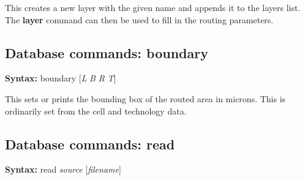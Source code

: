 This creates a new layer with the given name and appends it to the
layers list.  The {\bf layer} command can then be used to fill in the
routing parameters.

\subsection{Database commands: {\vt boundary}}

{\bf Syntax:} {\vt boundary} [{\it L} {\it B} {\it R} {\it T\/}]

This sets or prints the bounding box of the routed area in microns. 
This is ordinarily set from the cell and technology data.

\subsection{Database commands: {\vt read}}

{\bf Syntax:} {\vt read} {\it source} [{\it filename\/}]

